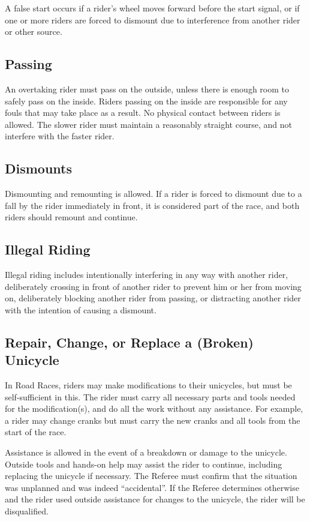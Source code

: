 A false start occurs if a rider's wheel moves forward before the start signal, or if one or more riders are forced to dismount due to interference from another rider or other source.

\subsection{Passing}

An overtaking rider must pass on the outside, unless there is enough room to safely pass on the inside.
Riders passing on the inside are responsible for any fouls that may take place as a result.
No physical contact between riders is allowed.
The slower rider must maintain a reasonably straight course, and not interfere with the faster rider.

\subsection{Dismounts}

Dismounting and remounting is allowed. 
If a rider is forced to dismount due to a fall by the rider immediately in front, it is considered part of the race, and both riders should remount and continue.

\subsection{Illegal Riding}

Illegal riding includes intentionally interfering in any way with another rider, deliberately crossing in front of another rider to prevent him or her from moving on, deliberately blocking another rider from passing, or distracting another rider with the intention of causing a dismount.

\subsection{Repair, Change, or Replace a (Broken) Unicycle}
In Road Races, riders may make modifications to their unicycles, but must be self-sufficient in this.
The rider must carry all necessary parts and tools needed for the modification(s), and do all the work without any assistance.
For example, a rider may change cranks but must carry the new cranks and all tools from the start of the race.

Assistance is allowed in the event of a breakdown or damage to the unicycle.
Outside tools and hands-on help may assist the rider to continue, including replacing the unicycle if necessary.
The Referee must confirm that the situation was unplanned and was indeed ``accidental''.
If the Referee determines otherwise and the rider used outside assistance for changes to the unicycle, the rider will be disqualified.

